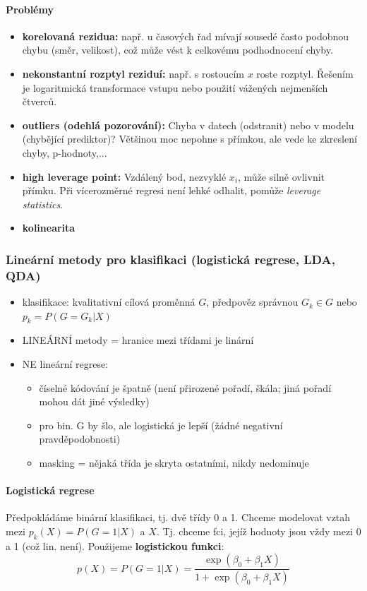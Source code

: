 \documentclass[11pt]{report} %
\numberwithin{equation}{section}
\begin{document}
\paragraph{Problémy}
\begin{itemize}
	\item \textbf{korelovaná rezidua:} např. u časových řad mívají sousedé často podobnou chybu (směr, velikost), což může vést k celkovému podhodnocení chyby.
	
	\item \textbf{nekonstantní rozptyl reziduí:} např. s rostoucím $x$ roste rozptyl. Řešením je logaritmická transformace vstupu nebo použití vážených nejmenších čtverců.
	
	\item \textbf{outliers (odehlá pozorování):} Chyba v datech (odstranit) nebo v modelu (chybějící prediktor)? Většinou moc nepohne s přímkou, ale vede ke zkreslení chyby, p-hodnoty,... 
	
	\item \textbf{high leverage point:} Vzdálený bod, nezvyklé $x_i$, může silně ovlivnit přímku. Při vícerozměrné regresi není lehké odhalit, pomůže \textit{leverage statistics}.
	
	\item \textbf{kolinearita}
\end{itemize}

\subsubsection{Lineární metody pro klasifikaci (logistická regrese, LDA, QDA)}
  \begin{itemize}
	\item klasifikace: kvalitativní cílová proměnná $G$, předpověz správnou $G_k \in G$ nebo $p_k = P(G=G_k | X)$
	\item LINEÁRNÍ metody = hranice mezi třídami je linární
	\item NE lineární regrese:
	\begin{itemize}
		\item číselné kódování je špatně (není přirozené pořadí, škála; jiná pořadí mohou dát jiné výsledky)
		\item pro bin. G by šlo, ale logistická je lepší (žádné negativní pravděpodobnosti)
		\item masking = nějaká třída je skryta ostatními, nikdy nedominuje
	\end{itemize}
	\end{itemize}
	\paragraph{Logistická regrese}
	Předpokládáme binární klasifikaci, tj. dvě třídy 0 a 1. Chceme modelovat vztah mezi $p_k(X) = P(G=1 | X)$ a $X$. Tj. chceme fci, jejíž hodnoty jsou vždy mezi 0 a 1 (což lin. není). Použijeme \textbf{logistickou funkci}:
	$$p(X) = P(G=1 | X) = \frac{\exp(\beta_0 + \beta_1X)}{1 + \exp(\beta_0 + \beta_1 X)}$$
	
\end{document}
